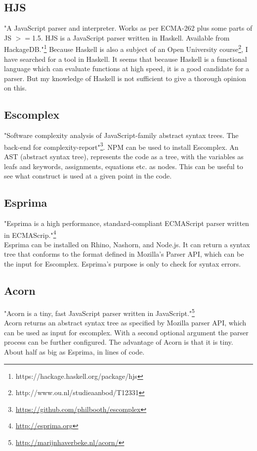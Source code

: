 \documentclass{article}
\begin{document}
\subsection{HJS}
"A JavaScript parser and interpreter. Works as per ECMA-262 plus some parts of JS $>=$1.5.
HJS is a JavaScript parser written in Haskell. Available from HackageDB."\footnote{https://hackage.haskell.org/package/hjs}
Because Haskell is also a subject of an Open University course\footnote{http://www.ou.nl/studieaanbod/T12331}, I have searched for a tool in Haskell.
It seems that because Haskell is a functional language which can evaluate functions at high speed, it is a good candidate for a parser.
But my knowledge of Haskell is not sufficient to give a thorough opinion on this.

\subsection{Escomplex}
"Software complexity analysis of JavaScript-family abstract syntax trees. The back-end for complexity-report"\footnote{\url{https://github.com/philbooth/escomplex}}.
NPM can be used to install Escomplex.
An AST (abstract syntax tree), represents the code as a tree, with the variables as leafs and keywords, assignments, equations etc. as nodes.
This can be useful to see what construct is used at a given point in the code.

\subsection{Esprima}
"Esprima is a high performance, standard-compliant ECMAScript parser written in ECMAScrip."\footnote{\url{http://esprima.org}}\\
Esprima can be installed on Rhino, Nashorn, and Node.js.
It can return a syntax tree that conforms to the format defined in Mozilla's Parser API, which can be the input for Escomplex.
Esprima's purpose is only to check for syntax errors.

\subsection{Acorn}
"Acorn is a tiny, fast JavaScript parser written in JavaScript."\footnote{\url{http://marijnhaverbeke.nl/acorn/}}\\
Acorn returns an abstract syntax tree as specified by Mozilla parser API, which can be used as input for escomplex.
With a second optional argument the parser process can be further configured.
The advantage of Acorn is that it is tiny. About half as big as Esprima, in lines of code.
\end{document}
